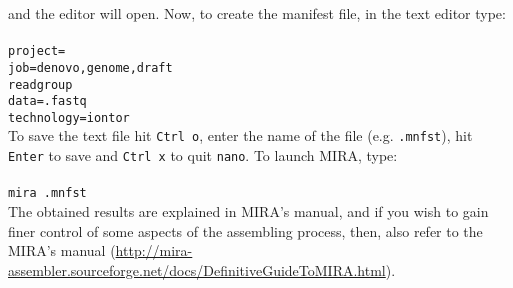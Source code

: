and the editor will open. Now, to create the manifest file, in the text editor type:\\~\\
\texttt{project=\denovoReads\\
job=denovo,genome,draft\\
readgroup\\
data=\denovoReads.fastq\\
technology=iontor} \\

To save the text file hit \texttt{Ctrl o}, enter the name of the file (e.g. \texttt{\denovoReads.mnfst}),
hit \texttt{Enter} to save and \texttt{Ctrl x} to quit \texttt{nano}. To launch MIRA, type:\\~\\
\texttt{mira \denovoReads.mnfst}\\

The obtained results are explained in MIRA's manual, and
if you wish to gain finer control of some aspects of the assembling process,
then, also refer to the MIRA's manual (\url{http://mira-assembler.sourceforge.net/docs/DefinitiveGuideToMIRA.html}).
